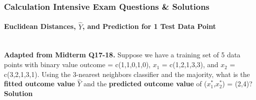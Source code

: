 \documentclass[../../dsa1101_notes.Rtex]{subfiles}\usepackage[]{graphicx}\usepackage[]{color}
\begin{document}
\subsubsection{Calculation Intensive Exam Questions \& Solutions}
\paragraph{Euclidean Distances, $\hat{Y}$, and Prediction for 1 Test Data Point}\mbox{}\\
\textbf{Adapted from Midterm Q17-18.} Suppose we have a training set of 5 data points with binary value outcome = c(1,1,0,1,0), \(x_1\) = c(1,2,1,3,3), and \(x_2\) = c(3,2,1,3,1). Using the 3-nearest neighbors classifier and the majority, what is the \textbf{fitted outcome value} \(\hat{Y}\) and the \textbf{predicted outcome value} of (\(x^*_1\),\(x^*_2\)) = (2,4)?\\
\textbf{Solution}
\end{document}
